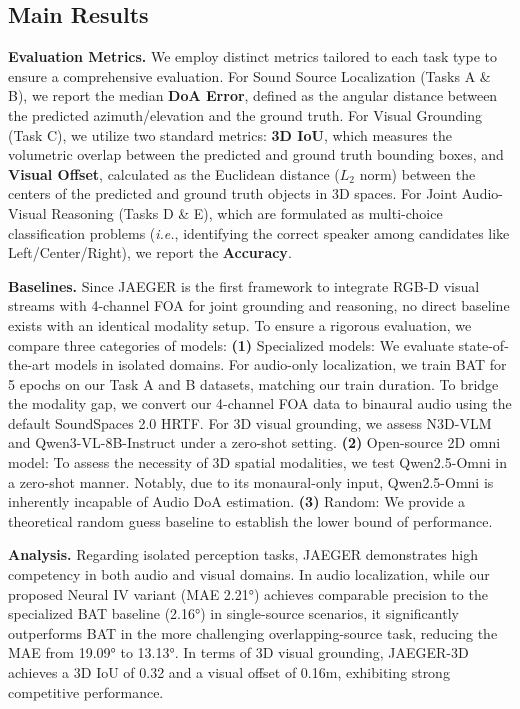 \subsection{Main Results}

\textbf{Evaluation Metrics.}
We employ distinct metrics tailored to each task type to ensure a comprehensive evaluation.
For Sound Source Localization (Tasks A \& B), we report the median \textbf{DoA Error}, defined as the angular distance between the predicted azimuth/elevation and the ground truth.
For Visual Grounding (Task C), we utilize two standard metrics: \textbf{3D IoU}, which measures the volumetric overlap between the predicted and ground truth bounding boxes, and \textbf{Visual Offset}, calculated as the Euclidean distance ($L_2$ norm) between the centers of the predicted and ground truth objects in 3D spaces.
For Joint Audio-Visual Reasoning (Tasks D \& E), which are formulated as multi-choice classification problems (\textit{i.e.}, identifying the correct speaker among candidates like Left/Center/Right), we report the \textbf{Accuracy}.

\textbf{Baselines.}
Since JAEGER is the first framework to integrate RGB-D visual streams with 4-channel FOA for joint grounding and reasoning, no direct baseline exists with an identical modality setup. To ensure a rigorous evaluation, we compare three categories of models:
\textbf{(1)} Specialized models: We evaluate state-of-the-art models in isolated domains. For audio-only localization, we train BAT \cite{zheng2024bat} for 5 epochs on our Task A and B datasets, matching our train duration. To bridge the modality gap, we convert our 4-channel FOA data to binaural audio using the default SoundSpaces 2.0 HRTF. For 3D visual grounding, we assess N3D-VLM \cite{wang2025n3d} and Qwen3-VL-8B-Instruct \cite{Qwen3-VL} under a zero-shot setting.
\textbf{(2)} Open-source 2D omni model: To assess the necessity of 3D spatial modalities, we test Qwen2.5-Omni \cite{xu2025qwen2} in a zero-shot manner. Notably, due to its monaural-only input, Qwen2.5-Omni is inherently incapable of Audio DoA estimation.
\textbf{(3)} Random: We provide a theoretical random guess baseline to establish the lower bound of performance.

\textbf{Analysis.} Regarding isolated perception tasks, JAEGER demonstrates high competency in both audio and visual domains. In audio localization, while our proposed Neural IV variant (MAE \ang{2.21}) achieves comparable precision to the specialized BAT baseline (\ang{2.16}) in single-source scenarios, it significantly outperforms BAT in the more challenging overlapping-source task, reducing the MAE from \ang{19.09} to \ang{13.13}. In terms of 3D visual grounding, JAEGER-3D achieves a 3D IoU of 0.32 and a visual offset of 0.16m, exhibiting strong competitive performance.

